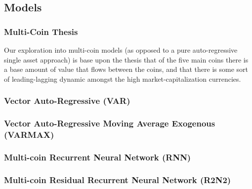 
\subsection{Models}

\subsubsection{Multi-Coin Thesis}

Our exploration into multi-coin models (as opposed to a pure auto-regressive single asset approach) is base upon the thesis that of the five main coins there is a base amount of value that flows between the coins, and that there is some sort of leading-lagging dynamic amongst the high market-capitalization currencies. 

\subsubsection{Vector Auto-Regressive (VAR)}


\subsubsection{Vector Auto-Regressive Moving Average Exogenous (VARMAX)}


\subsubsection{Multi-coin Recurrent Neural Network (RNN)}


\subsubsection{Multi-coin Residual Recurrent Neural Network (R2N2)}
